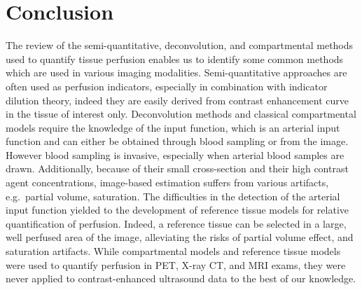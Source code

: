 \chapter{Conclusion}\label{chapter:conclusion}
The review of the semi-quantitative, deconvolution, and compartmental methods used to quantify tissue perfusion enables us to identify some common methods which are used in various imaging modalities.
Semi-quantitative approaches are often used as perfusion indicators, especially in combination with indicator dilution theory, indeed they are easily derived from contrast enhancement curve in the tissue of interest only.
Deconvolution methods and classical compartmental models require the knowledge of the input function, which is an arterial input function and can either be obtained through blood sampling or from the image.
However blood sampling is invasive, especially when arterial blood samples are drawn. 
Additionally, because of their small cross-section and their high contrast agent concentrations, image-based estimation suffers from various artifacts, e.g.~partial volume, saturation.
The difficulties in the detection of the arterial input function yielded to the development of reference tissue models for relative quantification of perfusion.
Indeed, a reference tissue can be selected in a large, well perfused area of the image, alleviating the risks of partial volume effect, and saturation artifacts.
While compartmental models and reference tissue models were used to quantify perfusion in PET, X-ray CT, and MRI exams, they were never applied to contrast-enhanced ultrasound data to the best of our knowledge.


